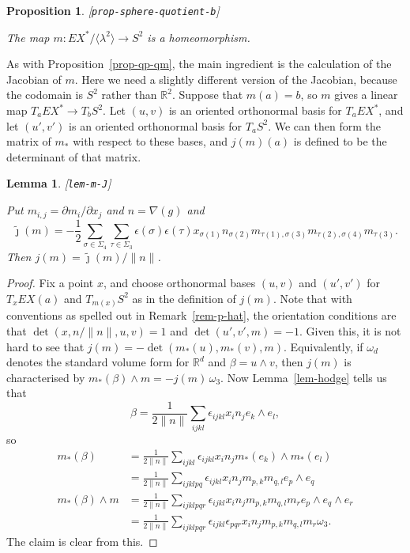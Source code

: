 \documentclass[reqno]{amsart}
\newcommand{\lbl}[1]{\label{#1}\textup{[\texttt{#1}]}\par}
\newcommand{\lbl}{\label}
\newcommand{\Sg}        {\Sigma}
\newcommand{\bt}        {\beta}
\newcommand{\ep}        {\epsilon}
\newcommand{\lm}        {\lambda}
\newcommand{\om}        {\omega}
\newcommand{\sg}        {\sigma}
\newcommand{\R}         {{\mathbb{R}}}
\newcommand{\ip}[1]     {\langle #1\rangle}
\newcommand{\tj}	{\widetilde{\jmath}}
\renewcommand{\:}{\colon}
\newtheorem{lemma}[theorem]{Lemma}
\newtheorem{proposition}[theorem]{Proposition}
\theoremstyle{definition}
\begin{document}
\begin{proposition}\lbl{prop-sphere-quotient-b}
 The map $m\:EX^*/\ip{\lm^2}\to S^2$ is a homeomorphism.
\end{proposition}

As with Proposition~\ref{prop-qp-qm}, the main ingredient is the
calculation of the Jacobian of $m$.  Here we need a slightly different
version of the Jacobian, because the codomain is $S^2$ rather than
$\R^2$.  Suppose that $m(a)=b$, so $m$ gives a linear map
$T_aEX^*\to T_bS^2$.  Let $(u,v)$ is an oriented orthonormal basis for
$T_aEX^*$, and let $(u',v')$ is an oriented orthonormal basis for
$T_aS^2$.  We can then form the matrix of $m_*$ with respect to these
bases, and $j(m)(a)$ is defined to be the determinant of that matrix.

\begin{lemma}\lbl{lem-m-J}
 Put $m_{i,j}=\partial m_i/\partial x_j$ and $n=\nabla(g)$ and
 \[ \tj(m) = -\frac{1}{2}\sum_{\sg\in\Sg_4}\sum_{\tau\in\Sg_3}
     \ep(\sg)\ep(\tau) x_{\sg(1)}n_{\sg(2)}
      m_{\tau(1),\sg(3)}m_{\tau(2),\sg(4)}m_{\tau(3)}.
 \]
 Then $j(m)=\tj(m)/\|n\|$.
\end{lemma}
\begin{proof}
 Fix a point $x$, and choose orthonormal bases $(u,v)$
 and $(u',v')$ for $T_xEX(a)$ and $T_{m(x)}S^2$ as in the definition
 of $j(m)$.  Note that with
 conventions as spelled out in Remark~\ref{rem-p-hat}, the orientation
 conditions are that $\det(x,n/\|n\|,u,v)=1$ and $\det(u',v',m)=-1$.
 Given this, it is not hard to see that
 $j(m)=-\det(m_*(u),m_*(v),m)$.  Equivalently, if $\om_d$ denotes
 the standard volume form for $\R^d$ and $\bt=u\wedge v$, then
 $j(m)$ is characterised by $m_*(\bt)\wedge m=-j(m)\,\om_3$.
 Now Lemma~\ref{lem-hodge} tells us that
 \[ \bt = \frac{1}{2\|n\|}
           \sum_{ijkl}\ep_{ijkl}x_in_je_k\wedge e_l,
 \]
 so
 \begin{align*}
   m_*(\bt) &=
     \frac{1}{2\|n\|} \sum_{ijkl}\ep_{ijkl}
       x_in_jm_*(e_k)\wedge m_*(e_l) \\
   &=
     \frac{1}{2\|n\|} \sum_{ijklpq}\ep_{ijkl}
       x_in_jm_{p,k}m_{q,l}e_p\wedge e_q \\
   m_*(\bt)\wedge m &=
    \frac{1}{2\|n\|} \sum_{ijklpqr}\ep_{ijkl}
       x_in_jm_{p,k}m_{q,l}m_r e_p\wedge e_q\wedge e_r \\
   &=
    \frac{1}{2\|n\|} \sum_{ijklpqr}\ep_{ijkl}\ep_{pqr}
       x_in_jm_{p,k}m_{q,l}m_r \om_3.
 \end{align*}
 The claim is clear from this.
\end{proof}
\end{document}
